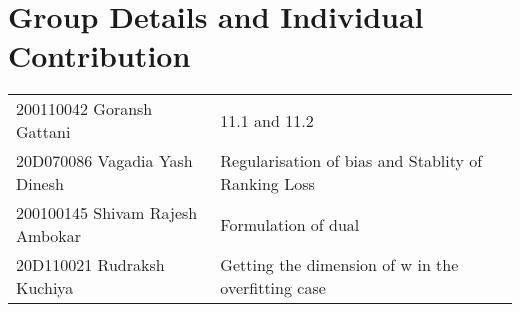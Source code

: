 \documentclass[11pt, twosides]{article}
\begin{document}



\section{Group Details and Individual Contribution}
\begin{center}
\begin{tabular}{ | m{17em} | m{5cm}| m{1cm} | } 
  \hline
  200110042 Goransh Gattani& 11.1 and 11.2 \\
  20D070086	Vagadia Yash Dinesh & Regularisation of bias and Stablity of Ranking Loss \\
  \hline
   200100145 Shivam Rajesh Ambokar & Formulation of dual  \\ 
 \hline
   20D110021 Rudraksh Kuchiya & Getting the dimension of w in the overfitting case  \\ \hline
\end{tabular}
\end{center}
\end{document}
